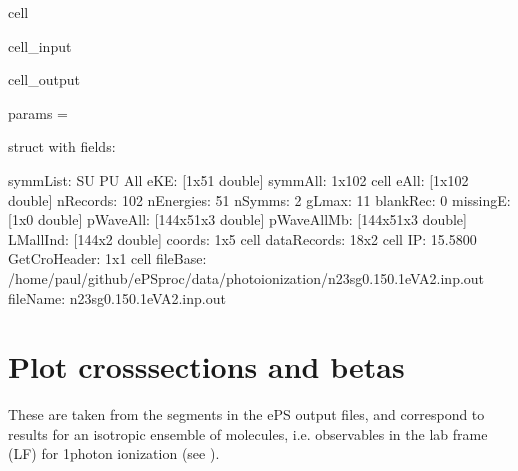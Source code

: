 \documentclass[letterpaper,10pt,english]{jupyterBook}
\begin{document}
\begin{sphinxuseclass}{cell}\begin{sphinxVerbatimInput}

\begin{sphinxuseclass}{cell_input}
\begin{sphinxVerbatim}[commandchars=\\\{\}]
\end{sphinxVerbatim}

\end{sphinxuseclass}\end{sphinxVerbatimInput}
\begin{sphinxVerbatimOutput}

\begin{sphinxuseclass}{cell_output}
\begin{sphinxVerbatim}[commandchars=\\\{\}]
params = 

  struct with fields:

        symmList: \PYGZob{}\PYGZsq{}SU\PYGZsq{}  \PYGZsq{}PU\PYGZsq{}  \PYGZsq{}All\PYGZsq{}\PYGZcb{}
             eKE: [1x51 double]
         symmAll: \PYGZob{}1x102 cell\PYGZcb{}
            eAll: [1x102 double]
        nRecords: 102
       nEnergies: 51
          nSymms: 2
           gLmax: 11
        blankRec: 0
        missingE: [1x0 double]
        pWaveAll: [144x51x3 double]
      pWaveAllMb: [144x51x3 double]
        LMallInd: [144x2 double]
          coords: \PYGZob{}1x5 cell\PYGZcb{}
     dataRecords: \PYGZob{}18x2 cell\PYGZcb{}
              IP: 15.5800
    GetCroHeader: \PYGZob{}\PYGZob{}1x1 cell\PYGZcb{}\PYGZcb{}
        fileBase: \PYGZsq{}/home/paul/github/ePSproc/data/photoionization/n2\PYGZus{}3sg\PYGZus{}0.1\PYGZhy{}50.1eV\PYGZus{}A2.inp.out\PYGZsq{}
        fileName: \PYGZsq{}n2\PYGZus{}3sg\PYGZus{}0.1\PYGZhy{}50.1eV\PYGZus{}A2.inp.out\PYGZsq{}
\end{sphinxVerbatim}

\end{sphinxuseclass}\end{sphinxVerbatimOutput}

\end{sphinxuseclass}

\section{Plot cross\sphinxhyphen{}sections and betas}
\label{\detokenize{testChpt/ePSproc_Matlab_demo_notebook_090821:plot-cross-sections-and-betas}}
\sphinxAtStartPar
These are taken from the  segments in the ePS output files, and correspond to results for an isotropic ensemble of molecules, i.e. observables in the lab frame (LF) for 1\sphinxhyphen{}photon ionization (see ).
\end{document}
